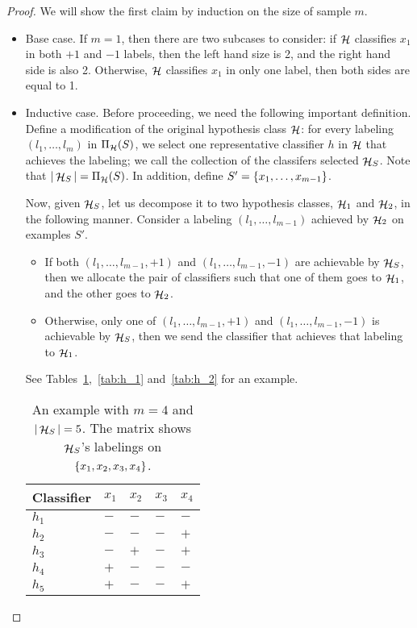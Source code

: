 \documentclass{article}
\DeclareMathOperator*{\Hcal}{{\cal H}}
\begin{document}
\begin{proof}
We will show the first claim by induction on the size of sample $m$.

\begin{itemize}
\item Base case. If $m = 1$, then there are two subcases to consider: if $\Hcal$ classifies $x_1$ in both $+1$ and $-1$ labels, then the left hand size is 2, and the right hand side is also 2. Otherwise, $\Hcal$ classifies $x_1$ in only one label, then both sides are equal to 1.

\item Inductive case. Before proceeding, we need the following important definition. Define a modification of the original hypothesis class $\Hcal$: for every labeling $(l_1, \ldots, l_m)$ in $\Pi_{\Hcal}(S)$, we select one representative classifier $h$ in $\Hcal$ that achieves the labeling; we call the collection of the classifers selected $\Hcal_S$. Note that $|\Hcal_S| = \Pi_{\Hcal}(S)$. In addition, define $S' = \cbr{x_1,\ldots,x_{m-1}}$.

Now, given $\Hcal_S$, let us decompose it to two hypothesis classes, $\Hcal_1$ and  $\Hcal_2$, in the following manner. Consider a labeling $(l_1, \ldots, l_{m-1})$ achieved by $\Hcal_2$ on examples $S'$.
\begin{itemize}
\item If both $(l_1, \ldots, l_{m-1}, +1)$ and $(l_1, \ldots, l_{m-1}, -1)$ are achievable by $\Hcal_S$, then we allocate the pair of classifiers such that one of them goes to $\Hcal_1$, and the other goes to $\Hcal_2$.
\item Otherwise, only one of $(l_1, \ldots, l_{m-1}, +1)$ and $(l_1, \ldots, l_{m-1}, -1)$ is achievable by $\Hcal_S$, then we send the classifier that achieves that labeling to $\Hcal_1$.
\end{itemize}
See Tables~\ref{tab:h_s},~\ref{tab:h_1} and~\ref{tab:h_2} for an example.

\begin{table}[H]
\centering
\begin{tabular}{l|llll}
Classifier & $x_1$ & $x_2$ & $x_3$ & $x_4$ \\
\hline
$h_1$ & $-$ & $-$ & $-$ & $-$ \\
$h_2$ & $-$ & $-$ & $-$ & $+$ \\
$h_3$ & $-$ & $+$ & $-$ & $+$ \\
$h_4$ & $+$ & $-$ & $-$ & $-$ \\
$h_5$ & $+$ & $-$ & $-$ & $+$ \\
\end{tabular}
\caption{An example with $m = 4$ and $|\Hcal_S| = 5$. The matrix shows $\Hcal_S$'s labelings on
$\cbr{x_1,x_2,x_3,x_4}$.}
\label{tab:h_s}
\end{table}


\end{itemize}
\end{proof}
\end{document}
